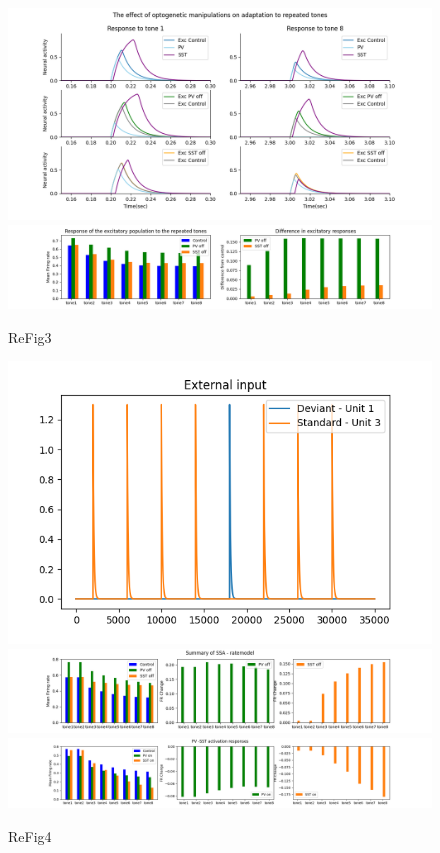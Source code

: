 \begin{figure}
 
 \includegraphics[width=\textwidth]{Figures/Fig3B}
 \includegraphics[width=\textwidth]{Figures/Fig3C}
 \caption{ReFig3}
\end{figure}






\begin{figure}
 \includegraphics[width=\textwidth]{Figures/Fig4A}
 \includegraphics[width=\textwidth]{Figures/Fig4BDE}
 \includegraphics[width=\textwidth]{Figures/Fig4F}
 \caption{ReFig4}
\end{figure}

